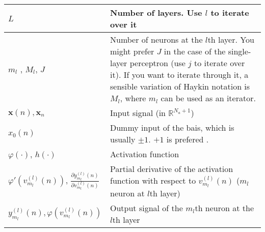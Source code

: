 \documentclass{article}
\begin{document}
\begin{xltabular}{\textwidth}{XX}
    \(L\) & Number of layers. Use \(l\) to iterate over it \\ \hline
    \(m_l\) \cite{bishopPatternRecognitionMachine2006}, \(M_l\), \(J\) \cite{bishopPatternRecognitionMachine2006} & Number of neurons at the \(l\)th layer. You might prefer \(J\) in the case of the single-layer perceptron (use \(j\) to iterate over it). If you want to iterate through it, a sensible variation of Haykin notation is \(M_l\), where \(m_l\) can be used as an iterator. \\ \hline
	\(\mathbf{x}(n), \mathbf{x}_n\)                                                                                       & Input signal (in \(\mathbb{R}^{N_a + 1}\))  \\ \hline
	\(x_0(n)\)                                                                                                      & Dummy input of the bais, which is usually \(\pm 1\). \(+1\) is prefered \cite{bishopPatternRecognitionMachine2006,haykinNeuralNetworksLearning2009}.                                                                                                                                                                                    \\ \hline
    \(\varphi(\cdot)\)\cite{haykinNeuralNetworksLearning2009}, \(h(\cdot)\)\cite{bishopPatternRecognitionMachine2006}                                                                                                    & Activation function                                                                                                                                                                                                          \\ \hline
    \(\varphi'(v_{m_l}^{(l)}(n))\)\cite{haykinNeuralNetworksLearning2009}, \(\frac{\partial y_{m_l}^{(l)}(n)}{\partial v_{m_l}^{(l)}(n)}\) \cite{haykinNeuralNetworksLearning2009}                                                                                                    & Partial derivative of the activation function with respect to \(v_{m_l}^{(l)}(n)\) (\(m_l\) neuron at \(l\)th layer)                                                                                                                                                                                                          \\ \hline
	\(y_{m_l}^{(l)}(n), \varphi \left( v_{m_l}^{(l)}(n) \right)\)                                                                                    & Output signal of the \(m_l\)th neuron at the \(l\)th layer                                                                                                                                                          \\ \hline

\end{xltabular}
\end{document}
